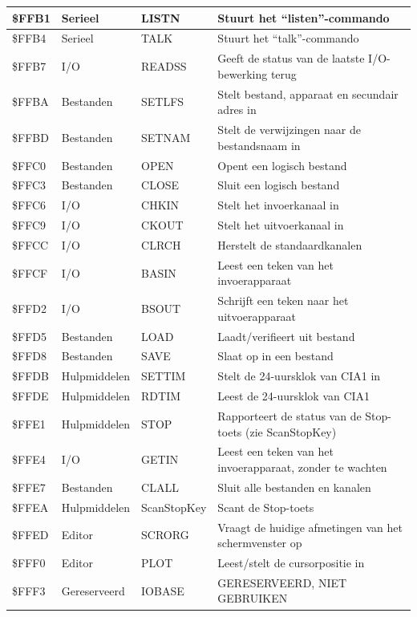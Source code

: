 \begin{longtable}{|L{1.2cm}|p{2.5cm}|p{2cm}|L{6cm}|}
\hline
\$FFB1 & Serieel & LISTN & Stuurt het ``listen''-commando \\
\hline
\$FFB4 & Serieel & TALK & Stuurt het ``talk''-commando \\
\hline
\$FFB7 & I/O & READSS & Geeft de status van de laatste I/O-bewerking terug \\
\hline
\$FFBA & Bestanden & SETLFS & Stelt bestand, apparaat en secundair adres in \\
\hline
\$FFBD & Bestanden & SETNAM & Stelt de verwijzingen naar de bestandsnaam in \\
\hline
\$FFC0 & Bestanden & OPEN & Opent een logisch bestand \\
\hline
\$FFC3 & Bestanden & CLOSE & Sluit een logisch bestand \\
\hline
\$FFC6 & I/O & CHKIN & Stelt het invoerkanaal in \\
\hline
\$FFC9 & I/O & CKOUT & Stelt het uitvoerkanaal in \\
\hline
\$FFCC & I/O & CLRCH & Herstelt de standaardkanalen \\
\hline
\$FFCF & I/O & BASIN & Leest een teken van het invoerapparaat \\
\hline
\$FFD2 & I/O & BSOUT & Schrijft een teken naar het uitvoerapparaat \\
\hline
\$FFD5 & Bestanden & LOAD & Laadt/verifieert uit bestand \\
\hline
\$FFD8 & Bestanden & SAVE & Slaat op in een bestand \\
\hline
\$FFDB & Hulpmiddelen & SETTIM & Stelt de 24-uursklok van CIA1 in \\
\hline
\$FFDE & Hulpmiddelen & RDTIM & Leest de 24-uursklok van CIA1 \\
\hline
\$FFE1 & Hulpmiddelen & STOP & Rapporteert de status van de Stop-toets (zie ScanStopKey) \\
\hline
\$FFE4 & I/O & GETIN & Leest een teken van het invoerapparaat, zonder te wachten \\
\hline
\$FFE7 & Bestanden & CLALL & Sluit alle bestanden en kanalen \\
\hline
\$FFEA & Hulpmiddelen & ScanStopKey & Scant de Stop-toets \\
\hline
\$FFED & Editor & SCRORG & Vraagt de huidige afmetingen van het schermvenster op \\
\hline
\$FFF0 & Editor & PLOT & Leest/stelt de cursorpositie in \\
\hline
\$FFF3 & Gereserveerd & IOBASE & GERESERVEERD, NIET GEBRUIKEN \\
\hline
\end{longtable}
\endgroup


